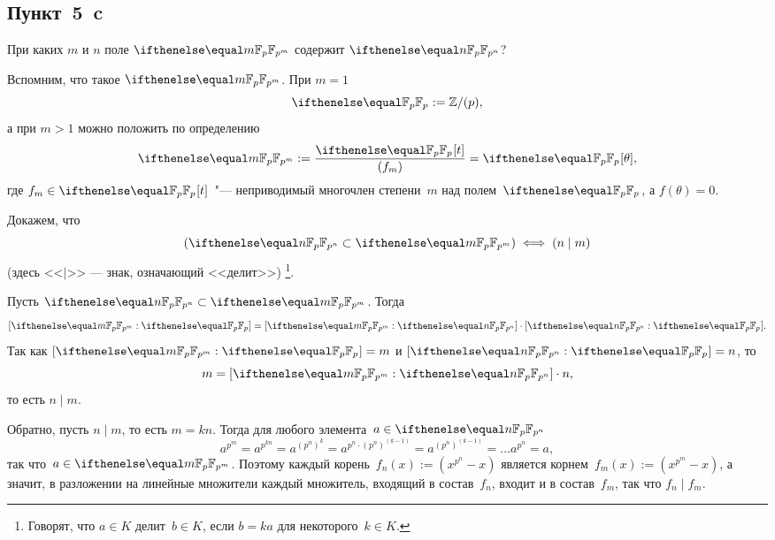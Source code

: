 \subsection{Пункт~5~c}

При каких $m$ и $n$ поле $\FFpm$ содержит $\FFpn$?

\begin{solution}
	Вспомним, что такое $\FFpm$. При $m = 1$
	\[
		\FFp := \ZZ/(p),
	\]
	а при $m > 1$ можно положить по определению
	\[
		\FFpm := \frac{\FFp{}[t]}{(f_m)} = \FFp{}[\theta]
		,
	\]
	где $f_m \in \FFp{}[t]$~"--- неприводимый многочлен степени~$m$ над полем~$\FFp$, а $f(\theta) = 0$.



	Докажем, что
	\[
		(\FFpn \subset \FFpm)
		\iff
		(n \mid m)
	\]
	(здесь <<$\mid$>> --- знак, означающий <<делит>>)%
	\footnote{%
		Говорят, что $a \in K$ делит~$b \in K$, если $b = ka$ для некоторого~$k \in K$.
	}.

	Пусть $\FFpn \subset \FFpm$. Тогда
	\[
		[\FFpm : \FFp] =
		[\FFpm : \FFpn] \cdot
		[\FFpn : \FFp]
		.
	\]
	Так как $[\FFpm : \FFp] = m$ и $[\FFpn : \FFp] = n$, то
	\[
		m = [\FFpm : \FFpn] \cdot n
		,
	\]
	то есть $n \mid m$.

	Обратно, пусть $n \mid m$, то есть $m = kn$. Тогда для любого элемента~$a \in \FFpn$
	\[
		a^{p^m} =
		a^{p^{kn}} =
		a^{(p^n)^k} =
		a^{p^n \cdot (p^n)^{(k-1)}} =
		a^{(p^n)^{(k-1)}} =
		\dots
		a^{p^n} =
		a,
	\]
	так что~$a \in \FFpm$. Поэтому каждый корень~$f_n(x) := (x^{p^n} - x)$ является корнем~$f_m(x) := (x^{p^m} - x)$, а значит, в разложении на линейные множители каждый множитель, входящий в состав~$f_n$, входит и в состав~$f_m$, так что $f_n \mid f_m$.
\end{solution}
